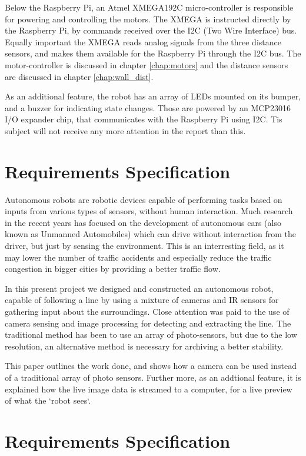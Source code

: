 Below the Raspberry Pi, an Atmel XMEGA192C micro-controller is responsible for powering and controlling the motors. The XMEGA is instructed directly by the Raspberry Pi, by commands received over the I2C (Two Wire Interface) bus. Equally important the XMEGA reads analog signals from the three distance sensors, and makes them available for the Raspberry Pi through the I2C bus. The motor-controller is discussed in chapter \ref{chap:motors} and the distance sensors are discussed in chapter \ref{chap:wall_dist}.

As an additional feature, the robot has an array of LEDs mounted on its bumper, and a buzzer for indicating state changes. Those are powered by an MCP23016 I/O expander chip, that communicates with the Raspberry Pi using I2C. Tis subject will not receive any more attention in the report than this.


\section{Requirements Specification}
Autonomous robots are robotic devices capable of performing tasks based on inputs from various types of sensors, without human interaction. Much research in the recent years has focused on the development of autonomous cars (also known as Unmanned Automobiles) which can drive without interaction from the driver, but just by sensing the environment. This is an interresting field, as it may lower the number of traffic accidents and especially reduce the traffic congestion in bigger cities by providing a better traffic flow.

In this present project we designed and constructed an autonomous robot, capable of following a line by using a mixture of cameras and IR sensors for gathering input about the surroundings. Close attention was paid to the use of camera sensing and image processing for detecting and extracting the line. The traditional method has been to use an array of photo-sensors, but due to the low resolution, an alternative method is necessary for archiving a better stability.

This paper outlines the work done, and shows how a camera can be used instead of a traditional array of photo sensors. Further more, as an addtional feature, it is explained how the live image data is streamed to a computer, for a live preview of what the `robot sees`.

\section{Requirements Specification}
